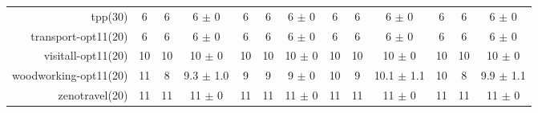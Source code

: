 \begin{center}
\begin{tabular}{|r|*{4}{ccc|}}
tpp(30) & 6 & 6 & 6 \(\pm\) 0 & 6 & 6 & 6 \(\pm\) 0 & 6 & 6 & 6 \(\pm\) 0 & 6 & 6 & 6 \(\pm\) 0\\
transport-opt11(20) & 6 & 6 & 6 \(\pm\) 0 & 6 & 6 & 6 \(\pm\) 0 & 6 & 6 & 6 \(\pm\) 0 & 6 & 6 & 6 \(\pm\) 0\\
visitall-opt11(20) & 10 & 10 & 10 \(\pm\) 0 & 10 & 10 & 10 \(\pm\) 0 & 10 & 10 & 10 \(\pm\) 0 & 10 & 10 & 10 \(\pm\) 0\\
woodworking-opt11(20) & 11 & 8 & 9.3 \(\pm\) 1.0 & 9 & 9 & 9 \(\pm\) 0 & 10 & 9 & 10.1 \(\pm\) 1.1 & 10 & 8 & 9.9 \(\pm\) 1.1\\
zenotravel(20) & 11 & 11 & 11 \(\pm\) 0 & 11 & 11 & 11 \(\pm\) 0 & 11 & 11 & 11 \(\pm\) 0 & 11 & 11 & 11 \(\pm\) 0\\
\end{tabular}
\end{center}
